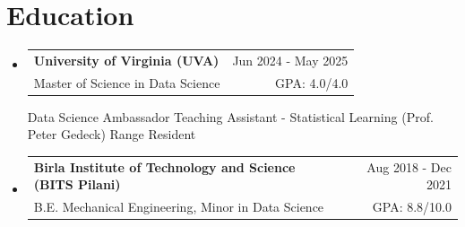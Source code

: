 \documentclass[letterpaper,11pt]{article}
\makeatletter
\newcommand{\resumeeduSubheading}[4]{
  \item
    \begin{tabular*}{1\textwidth}{l@{\extracolsep{\fill}}r}
      \textbf{\large{#1}} & {\small{#4}} \\
      {{\small{#3}}} & {{\small{#2}}}
    \end{tabular*}
  \vspace{-0.4cm}
}
\newcommand{\resumeSubHeadingListStart}{\begin{itemize}[leftmargin=0.0in, label={}]}
\newcommand{\resumeSubHeadingListEnd}{\end{itemize}}
\makeatother
\begin{document}
\section{Education}
\resumeSubHeadingListStart
\resumeeduSubheading
    {University of Virginia {(UVA)}}
    {GPA: 4.0/4.0}
    {Master of Science in Data Science}
    {Jun 2024 - May 2025}

    \vspace{1pt}
    \footnotesize{
    Data Science Ambassador {\textbullet}
    Teaching Assistant - Statistical Learning (Prof. Peter Gedeck) {\textbullet}
    Range Resident
    }

    \vspace{1pt}
    


\resumeeduSubheading
    {Birla Institute of Technology and Science \normalsize{(BITS Pilani)}}
    {GPA: 8.8/10.0}
    {B.E. Mechanical Engineering, Minor in Data Science}
    {Aug 2018 - Dec 2021}
\resumeSubHeadingListEnd
\vspace{-12pt}












\end{document}
